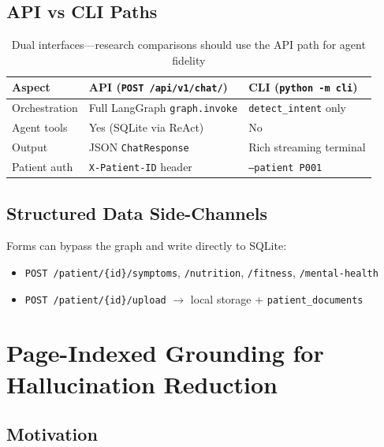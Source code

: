 \documentclass[12pt,a4paper]{article}
\begin{document}
\subsection{API vs CLI Paths}

\begin{table}[H]
\centering
\renewcommand{\arraystretch}{1.4}
\begin{tabularx}{\textwidth}{lXX}
\toprule
\textbf{Aspect} & \textbf{API (\texttt{POST /api/v1/chat/})} & \textbf{CLI (\texttt{python -m cli})} \\
\midrule
Orchestration & Full LangGraph \texttt{graph.invoke} & \texttt{detect\_intent} only \\
Agent tools   & Yes (SQLite via ReAct) & No \\
Output        & JSON \texttt{ChatResponse} & Rich streaming terminal \\
Patient auth  & \texttt{X-Patient-ID} header & \texttt{--patient P001} \\
\bottomrule
\end{tabularx}
\caption{Dual interfaces---research comparisons should use the API path for agent fidelity}
\end{table}

\subsection{Structured Data Side-Channels}

Forms can bypass the graph and write directly to SQLite:

\begin{itemize}[noitemsep]
    \item \texttt{POST /patient/\{id\}/symptoms}, \texttt{/nutrition}, \texttt{/fitness}, \texttt{/mental-health}
    \item \texttt{POST /patient/\{id\}/upload} $\rightarrow$ local storage + \texttt{patient\_documents}
\end{itemize}

\newpage

\section{Page-Indexed Grounding for Hallucination Reduction}

\subsection{Motivation}
\end{document}
